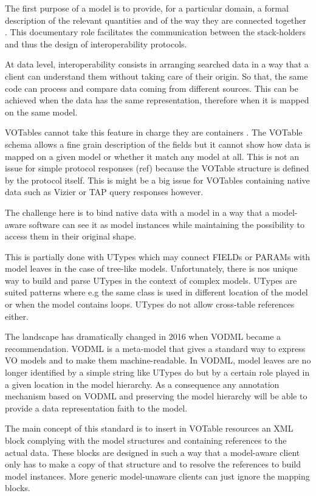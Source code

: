 
The first purpose of a model is to provide, for a particular domain, a formal description of the relevant quantities and of the way they are connected together .
This documentary role facilitates the communication between the stack-holders and thus the design of interoperability protocols. 

At data level, interoperability consists in arranging searched data in a way that a client can understand them without taking care of their origin. 
So that, the same code can process and compare data coming from different sources.  
This can be achieved when the data has the same representation, therefore when it is mapped on the same model.

VOTables cannot take this feature in charge they are containers \citep{2019ivoa.spec.1021O}. 
The VOTable schema allows a fine grain description of the fields but it cannot show how data is mapped on a given model or whether it match any model at all. 
This is not an issue for simple protocol responses (ref) because the VOTable structure is defined by the protocol itself. 
This is might be a big issue for VOTables containing native data such as Vizier  or TAP query responses however.

The challenge here is to bind native data with a model in a way that a model-aware software can see it as 
model instances while maintaining the possibility to access them in their original shape.

This is partially done with UTypes which may connect FIELDs or PARAMs with model leaves in the case of tree-like models. 
Unfortunately, there is nos unique  way to build and parse UTypes in the context of complex models. 
UTypes are suited patterns where e.g the same class is used in different location of the model or when the model contains loops. 
UTypes do not allow cross-table references either.

The landscape has dramatically changed in 2016 when VODML \citep{2018ivoa.spec.0910L} became a recommendation. 
VODML is a meta-model that gives a standard way to express VO models and to make them machine-readable.
In VODML, model leaves are no longer identified by a simple string like UTypes do but by a certain role played in a given location in the model hierarchy.
As a consequence any annotation mechanism based on VODML and preserving the model hierarchy will be able  to provide a data representation faith to the model.

The main concept of this standard is to insert in VOTable resources an XML block complying with the 
model structures and containing references to the actual data.
These blocks are designed in such a way that a model-aware client only has to make a copy of that structure and to resolve the references  
to build model instances. More generic model-unaware clients can just ignore the mapping blocks. 


